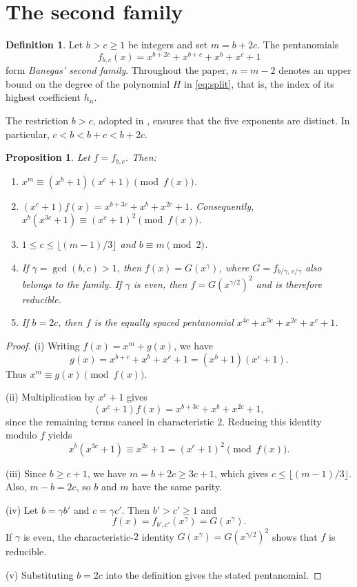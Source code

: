 \documentclass{ieeeaccess}
\theoremstyle{plain}
\newtheorem{proposition}[theorem]{Proposition}
\theoremstyle{definition}
\newtheorem{definition}[theorem]{Definition}
\begin{document}
\section{The second family}\label{sec:family}

\begin{definition}\label{def:family}
Let $b>c\ge1$ be integers and set $m=b+2c$. The pentanomials
\[
  f_{b,c}(x)=x^{b+2c}+x^{b+c}+x^b+x^c+1
\]
form \emph{Banegas' second family}. Throughout the paper, $n=m-2$ denotes an
upper bound on the degree of the polynomial $H$ in \eqref{eq:split}, that is,
the index of its highest coefficient $h_n$.
\end{definition}

The restriction $b>c$, adopted in \cite{Banegas2015}, ensures that the five
exponents are distinct. In particular, $c<b<b+c<b+2c$.

\begin{proposition}\label{prop:basic}
Let $f=f_{b,c}$. Then:
\begin{enumerate}[label=(\roman*),itemsep=1pt]
  \item $x^m\equiv(x^b+1)(x^c+1)\pmod{f(x)}$.

  \item $(x^c+1)f(x)=x^{b+3c}+x^b+x^{2c}+1$.
  Consequently, $x^b(x^{3c}+1)\equiv(x^c+1)^2\pmod{f(x)}$.

  \item $1\le c\le\lfloor(m-1)/3\rfloor$ and
  $b\equiv m\pmod 2$.

  \item If $\gamma=\gcd(b,c)>1$, then
  $f(x)=G(x^\gamma)$, where $G=f_{b/\gamma,\,c/\gamma}$ also belongs to the
  family. If $\gamma$ is even, then $f=G(x^{\gamma/2})^2$ and is therefore
  reducible.

  \item If $b=2c$, then $f$ is the equally spaced
  pentanomial $x^{4c}+x^{3c}+x^{2c}+x^c+1$.
\end{enumerate}
\end{proposition}

\begin{proof}
(i) Writing $f(x)=x^m+g(x)$, we have
\[
  g(x)=x^{b+c}+x^b+x^c+1=(x^b+1)(x^c+1).
\]
Thus $x^m\equiv g(x)\pmod{f(x)}$.

(ii) Multiplication by $x^c+1$ gives
\[
  (x^c+1)f(x)=x^{b+3c}+x^b+x^{2c}+1,
\]
since the remaining terms cancel in characteristic $2$. Reducing this identity
modulo $f$ yields
\[
  x^b(x^{3c}+1)\equiv x^{2c}+1
  =(x^c+1)^2\pmod{f(x)}.
\]

(iii) Since $b\ge c+1$, we have $m=b+2c\ge3c+1$, which gives
$c\le\lfloor(m-1)/3\rfloor$. Also, $m-b=2c$, so $b$ and $m$ have the same
parity.

(iv) Let $b=\gamma b'$ and $c=\gamma c'$. Then $b'>c'\ge1$ and
\[
  f(x)=f_{b',c'}(x^\gamma)=G(x^\gamma).
\]
If $\gamma$ is even, the characteristic-$2$ identity
$G(x^{\gamma})=G(x^{\gamma/2})^2$ shows that $f$ is reducible.

(v) Substituting $b=2c$ into the definition gives the stated pentanomial.
\end{proof}
\end{document}

